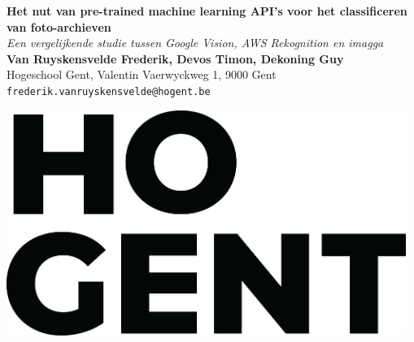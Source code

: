 \documentclass[a0,portrait]{a0poster}
\begin{document}


\begin{minipage}[t]{0.75\linewidth}
\VeryHuge \color{HoGentAccent1} \textbf{Het nut van pre-trained machine learning API’s voor het classificeren van foto-archieven} \color{Black}\\ %
\Huge\textit{Een vergelijkende studie tussen Google Vision, AWS Rekognition en imagga}\\[2.4cm] %
\huge \textbf{Van Ruyskensvelde Frederik, Devos Timon, Dekoning Guy}\\[0.5cm] %
\huge Hogeschool Gent, Valentin Vaerwyckweg 1, 9000 Gent\\[0.4cm] %
\Large \texttt{frederik.vanruyskensvelde@hogent.be} \\
\end{minipage}
%
\begin{minipage}[t]{0.25\linewidth}
\includegraphics[width=13cm,right]{figures/HOGENT_Logo_Pos_rgb.png} 

\end{minipage}

\vspace{1cm} %

\end{document}
